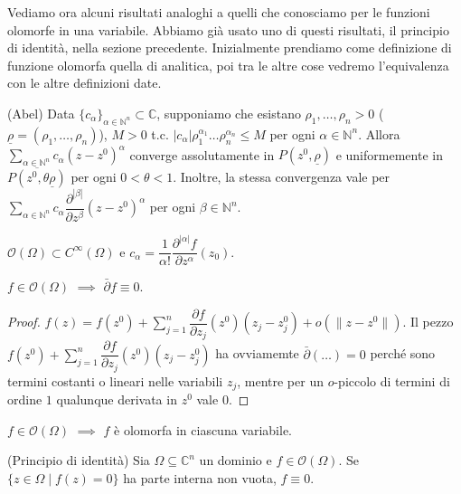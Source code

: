 Vediamo ora alcuni risultati analoghi a quelli che conosciamo per le funzioni olomorfe in una variabile. Abbiamo già usato uno di questi risultati, il principio di identità, nella sezione precedente. Inizialmente prendiamo come definizione di funzione olomorfa quella di analitica, poi tra le altre cose vedremo l'equivalenza con le altre definizioni date.

\begin{lm}
  (Abel) Data $\{c_{\alpha}\}_{\alpha \in \mathbb{N}^n} \subset \mathbb{C}$, supponiamo che esistano $\rho_1, \dots, \rho_n>0$ ($\underline{\rho}=(\rho_1, \dots, \rho_n)$), $M>0$ t.c. $|c_{\alpha}|\rho_1^{\alpha_1}\dots\rho_n^{\alpha_n} \le M$ per ogni $\alpha \in \mathbb{N}^n$.
  Allora $\displaystyle \sum_{\alpha \in \mathbb{N}^n} c_{\alpha}(z-z^0)^{\alpha}$ converge assolutamente in $P(z^0, \underline{\rho})$ e uniformemente in $\overline{P(z^0, \theta\underline{\rho})}$ per ogni $0<\theta<1$.
  Inoltre, la stessa convergenza vale per $\displaystyle \sum_{\alpha \in \mathbb{N}^n} c_{\alpha} \dfrac{\partial^{|\beta|}}{\partial z^\beta}(z-z^0)^\alpha$ per ogni $\beta \in \mathbb{N}^n$.
\end{lm}

\begin{cor} \label{coeff_anal_multi}
  $\mathcal{O}(\Omega) \subset C^\infty(\Omega)$ e $c_\alpha=\dfrac{1}{\alpha!}\dfrac{\partial^{|\alpha|} f}{\partial z^\alpha}(z_0)$.
\end{cor}

\begin{cor}
  $f \in \mathcal{O}(\Omega)$ $\implies$ $\bar{\partial}f \equiv 0$.
\end{cor}

\begin{proof}
  $\displaystyle f(z)=f(z^0)+\sum_{j=1}^n \dfrac{\partial f}{\partial z_j}(z^0)(z_j-z_j^0)+o(\|z-z^0\|)$. Il pezzo $\displaystyle f(z^0)+\sum_{j=1}^n \dfrac{\partial f}{\partial z_j}(z^0)(z_j-z_j^0)$ ha ovviamemte $\bar{\partial}(\dots)=0$ perché sono termini costanti o lineari nelle variabili $z_j$, mentre per un $o$-piccolo di termini di ordine $1$ qualunque derivata in $z^0$ vale $0$.
\end{proof}

\begin{cor} \label{olo_var}
  $f \in \mathcal{O}(\Omega)$ $\implies$ $f$ è olomorfa in ciascuna variabile.
\end{cor}

\begin{prop}
  (Principio di identità) Sia $\Omega \subseteq \mathbb{C}^n$ un dominio e $f \in \mathcal{O}(\Omega)$. Se $\{z \in \Omega \mid f(z)=0\}$ ha parte interna non vuota, $f \equiv 0$.
\end{prop}

